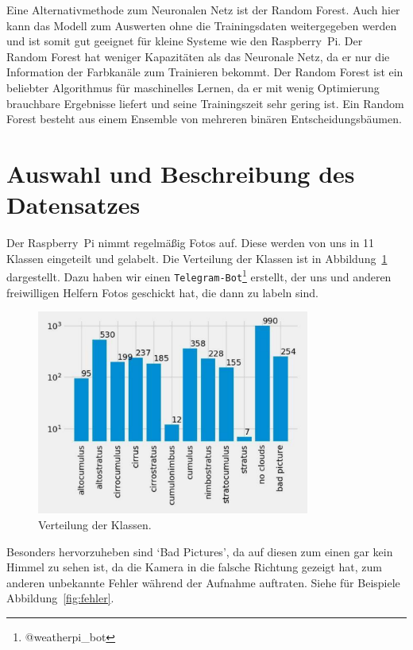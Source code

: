 Eine Alternativmethode zum Neuronalen Netz ist der Random Forest. Auch
hier kann das Modell zum Auswerten ohne die Trainingsdaten weitergegeben
werden und ist somit gut geeignet für kleine Systeme wie den Raspberry~Pi.
Der Random Forest hat weniger Kapazitäten als das Neuronale Netz, da
er nur die Information der Farbkanäle zum Trainieren bekommt. Der Random
Forest ist ein beliebter Algorithmus für maschinelles Lernen, da er mit wenig
Optimierung brauchbare Ergebnisse liefert und seine Trainingszeit sehr
gering ist. Ein Random Forest besteht aus einem Ensemble von mehreren
binären Entscheidungsbäumen.

\hypertarget{auswahl-und-beschreibung-des-datensatzes}{%
\section{Auswahl und Beschreibung des
Datensatzes}\label{auswahl-und-beschreibung-des-datensatzes}}

Der Raspberry~Pi nimmt regelmäßig Fotos auf. Diese werden von uns in 11
Klassen eingeteilt und gelabelt.
Die Verteilung der Klassen ist in Abbildung~\ref{fig:verteilung} dargestellt.
Dazu haben wir einen
\texttt{Telegram-Bot}\footnote{@weatherpi\_bot} erstellt, der uns und
anderen freiwilligen Helfern Fotos geschickt hat, die dann zu labeln
sind.

\begin{figure}
\centering
\includegraphics[width=0.8\textwidth]{content/histogramm_samples.pdf}
\caption{Verteilung der Klassen.}%
\label{fig:verteilung}
\end{figure}

Besonders hervorzuheben sind `Bad Pictures', da auf diesen zum einen
gar kein Himmel zu sehen ist, da die Kamera in die falsche Richtung
gezeigt hat, zum anderen unbekannte Fehler während der
Aufnahme auftraten.
Siehe für Beispiele Abbildung~\ref{fig:fehler}.

